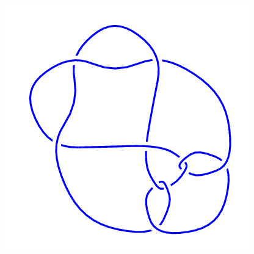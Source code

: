 \begin{figure}[H]
\begin{minipage}[b]{.18\linewidth}
	\end{minipage}
	\begin{minipage}[b]{.18\linewidth}
		\centering
		\includegraphics[width=\linewidth]{../data/10_66.png}
	\end{minipage}
\end{figure}
